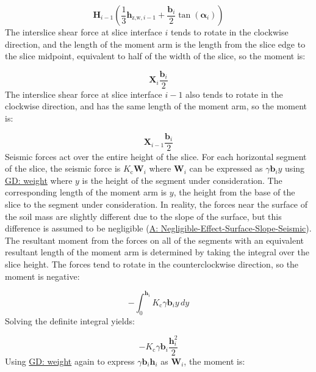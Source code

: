 \documentclass[12pt]{article}
\begin{document}
\begin{displaymath}
{\mathbf{H}}_{i-1} \left(\frac{1}{3} {\mathbf{h}_{\text{z,w},i-1}}+\frac{{\mathbf{b}}_{i}}{2} \tan\left({\mathbf{α}}_{i}\right)\right)
\end{displaymath}
The interslice shear force at slice interface $i$ tends to rotate in the clockwise direction, and the length of the moment arm is the length from the slice edge to the slice midpoint, equivalent to half of the width of the slice, so the moment is:

\begin{displaymath}
{\mathbf{X}}_{i} \frac{{\mathbf{b}}_{i}}{2}
\end{displaymath}
The interslice shear force at slice interface $i-1$ also tends to rotate in the clockwise direction, and has the same length of the moment arm, so the moment is:

\begin{displaymath}
{\mathbf{X}}_{i-1} \frac{{\mathbf{b}}_{i}}{2}
\end{displaymath}
Seismic forces act over the entire height of the slice. For each horizontal segment of the slice, the seismic force is ${K_{\text{c}}} {\mathbf{W}}_{i}$ where ${\mathbf{W}}_{i}$ can be expressed as $γ {\mathbf{b}}_{i} y$ using \hyperref[GD:weight]{GD: weight} where $y$ is the height of the segment under consideration. The corresponding length of the moment arm is $y$, the height from the base of the slice to the segment under consideration. In reality, the forces near the surface of the soil mass are slightly different due to the slope of the surface, but this difference is assumed to be negligible (\hyperref[assumpNESSS]{A: Negligible-Effect-Surface-Slope-Seismic}). The resultant moment from the forces on all of the segments with an equivalent resultant length of the moment arm is determined by taking the integral over the slice height. The forces tend to rotate in the counterclockwise direction, so the moment is negative:

\begin{displaymath}
-\int_{0}^{{\mathbf{h}}_{i}}{{K_{\text{c}}} γ {\mathbf{b}}_{i} y}\,dy
\end{displaymath}
Solving the definite integral yields:

\begin{displaymath}
-{K_{\text{c}}} γ {\mathbf{b}}_{i} \frac{{\mathbf{h}}_{i}^{2}}{2}
\end{displaymath}
Using \hyperref[GD:weight]{GD: weight} again to express $γ {\mathbf{b}}_{i} {\mathbf{h}}_{i}$ as ${\mathbf{W}}_{i}$, the moment is:
\end{document}
